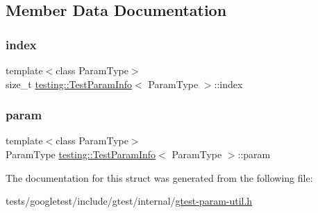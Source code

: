 \subsection{Member Data Documentation}
\mbox{\label{structtesting_1_1TestParamInfo_ad4d7bc02cbcc571eb3c1d2ec3ba5bb53}} 
\subsubsection{\texorpdfstring{index}{index}}
{\footnotesize\ttfamily template$<$class Param\+Type$>$ \\
size\+\_\+t \hyperlink{structtesting_1_1TestParamInfo}{testing\+::\+Test\+Param\+Info}$<$ Param\+Type $>$\+::index}

\mbox{\label{structtesting_1_1TestParamInfo_a146d921039f9da8b1336f7cc6e8436c2}} 
\subsubsection{\texorpdfstring{param}{param}}
{\footnotesize\ttfamily template$<$class Param\+Type$>$ \\
Param\+Type \hyperlink{structtesting_1_1TestParamInfo}{testing\+::\+Test\+Param\+Info}$<$ Param\+Type $>$\+::param}



The documentation for this struct was generated from the following file\+:\begin{DoxyCompactItemize}
\item 
tests/googletest/include/gtest/internal/\hyperlink{gtest-param-util_8h}{gtest-\/param-\/util.\+h}\end{DoxyCompactItemize}
